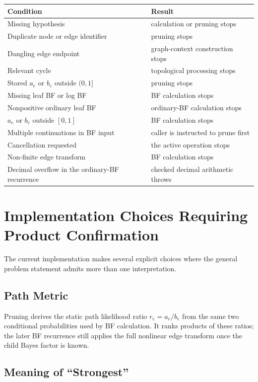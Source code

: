 \documentclass[11pt]{article}
\begin{document}
\begin{center}
\begin{tabular}{p{}p{}}
\toprule
Condition & Result \\
\midrule
Missing hypothesis & calculation or pruning stops \\
Duplicate node or edge identifier & pruning stops \\
Dangling edge endpoint & graph-context construction stops \\
Relevant cycle & topological processing stops \\
Stored \(a_e\) or \(b_e\) outside \((0,1]\) & pruning stops \\
Missing leaf BF or log BF & BF calculation stops \\
Nonpositive ordinary leaf BF & ordinary-BF calculation stops \\
\(a_e\) or \(b_e\) outside \([0,1]\) & BF calculation stops \\
Multiple continuations in BF input & caller is instructed to prune first \\
Cancellation requested & the active operation stops \\
Non-finite edge transform & BF calculation stops \\
Decimal overflow in the ordinary-BF recurrence
    & checked decimal arithmetic throws \\
\bottomrule
\end{tabular}
\end{center}

\section{Implementation Choices Requiring Product Confirmation}

The current implementation makes several explicit choices where the general
problem statement admits more than one interpretation.

\subsection{Path Metric}

Pruning derives the static path likelihood ratio \(r_e=a_e/b_e\) from the
same two conditional probabilities used by BF calculation.  It ranks products
of these ratios; the later BF recurrence still applies the full nonlinear edge
transform once the child Bayes factor is known.

\subsection{Meaning of ``Strongest''}
\end{document}
